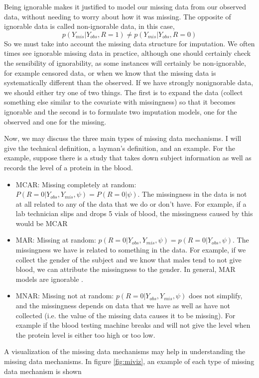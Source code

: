 Being ignorable makes it justified to model our missing data from our observed data, without needing to worry about how it was missing.
The opposite of ignorable data is called non-ignorable data, in this case, 
$$p(Y_{mis}|Y_{obs},R=1)\neq p(Y_{mis}|Y_{obs},R=0)$$
So we must take into account the missing data structure for imputation.
We often times see ignorable missing data in practice, although one should certainly check the sensibility of ignorability, as some instances will certainly be non-ignorable, for example censored data, or when we know that the missing data is systematically different than the observed. If we have strongly nonignorable data, we should either try one of two things. The first is to expand the data (collect something else similar to the covariate with missingness) so that it becomes ignorable and the second is to formulate two imputation models, one for the observed and one for the missing.

Now, we may discuss the three main types of missing data mechanisms. I will give the technical definition, a layman's definition, and an example. For the example, suppose there is a study that takes down subject information as well as records the level of a protein in the blood.
\begin{itemize}
\item MCAR: Missing completely at random:  $P(R=0|Y_{obs},Y_{mis},\psi)=P(R=0|\psi)$. The missingness in the data is not at all related to any of the data that we do or don't have. For example, if a lab technician slips and drops 5 vials of blood, the missingness caused by this would be MCAR
\item MAR: Missing at random: $p(R=0|Y_{obs},Y_{mis},\psi)= p(R=0|Y_{obs},\psi)$. The missingness we have is related to something in the data. For example, if we collect the gender of the subject and we know that males tend to not give blood, we can attribute the missingness to the gender. In general, MAR models are ignorable \cite{VanBuuren2012}.
\item MNAR: Missing not at random: $p(R=0|Y_{obs},Y_{mis},\psi)$ does not simplify, and the missingness depends on data that we have as well as have not collected (i.e. the value of the missing data causes it to be missing). For example if the blood testing machine breaks and will not give the level when the protein level is either too high or too low.
\end{itemize}

A visualization of the missing data mechanisms may help in understanding the missing data mechanisms. In figure \ref{fig:miviz}, an example of each type of missing data mechanism is shown


